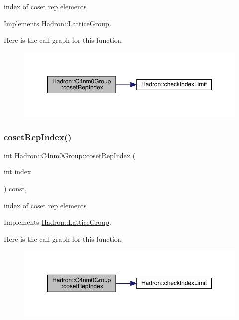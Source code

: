 index of coset rep elements 

Implements \mbox{\hyperlink{structHadron_1_1LatticeGroup_a7e3b9b5e2f596e6c40d64aa939a3ad6c}{Hadron\+::\+Lattice\+Group}}.

Here is the call graph for this function\+:
\nopagebreak
\begin{figure}[H]
\begin{center}
\leavevmode
\includegraphics[width=350pt]{da/da1/structHadron_1_1C4nm0Group_abac118ef8b96cecf62143c917e23736e_cgraph}
\end{center}
\end{figure}
\mbox{\label{structHadron_1_1C4nm0Group_abac118ef8b96cecf62143c917e23736e}} 
\subsubsection{\texorpdfstring{cosetRepIndex()}{cosetRepIndex()}\hspace{0.1cm}{\footnotesize\ttfamily [3/3]}}
{\footnotesize\ttfamily int Hadron\+::\+C4nm0\+Group\+::coset\+Rep\+Index (\begin{DoxyParamCaption}\item[{int}]{index }\end{DoxyParamCaption}) const\hspace{0.3cm}{\ttfamily [inline]}, {\ttfamily [virtual]}}

index of coset rep elements 

Implements \mbox{\hyperlink{structHadron_1_1LatticeGroup_a7e3b9b5e2f596e6c40d64aa939a3ad6c}{Hadron\+::\+Lattice\+Group}}.

Here is the call graph for this function\+:
\nopagebreak
\begin{figure}[H]
\begin{center}
\leavevmode
\includegraphics[width=350pt]{da/da1/structHadron_1_1C4nm0Group_abac118ef8b96cecf62143c917e23736e_cgraph}
\end{center}
\end{figure}
\mbox{\label{structHadron_1_1C4nm0Group_adc1a59b08c4fafae324e82e8ded86919}} 

